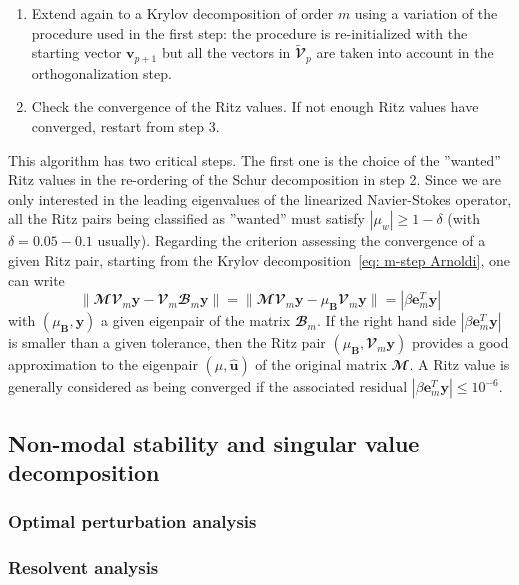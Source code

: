 \begin{enumerate}
      \item Extend again to a Krylov decomposition of order $m$ using a variation of the procedure used in the first step: the procedure is re-initialized with the starting vector ${\mathbf v}_{p+1}$ but all the vectors in $\tilde{\mathbfcal{V}}_p$ are taken into account in the orthogonalization step.

      \item Check the convergence of the Ritz values. If not enough Ritz values have converged, restart from step 3.

    \end{enumerate}
    This algorithm has two critical steps. The first one is the choice of the ''wanted'' Ritz values in the re-ordering of the Schur decomposition in step 2. Since we are only interested in the leading eigenvalues of the linearized Navier-Stokes operator, all the Ritz pairs being classified as ''wanted'' must satisfy $\left| \mu_w \right| \ge 1 - \delta$ (with $\delta = 0.05 - 0.1$ usually). Regarding the criterion assessing the convergence of a given Ritz pair, starting from the Krylov decomposition~\eqref{eq: m-step Arnoldi}, one can write
    \begin{equation}
      \| \mathbfcal{M} \mathbfcal{V}_m \mathbf{y} - \mathbfcal{V}_m \mathbfcal{B}_m \mathbf{y} \| = \| \mathbfcal{M} \mathbfcal{V}_m \mathbf{y} - \mu_{\mathbf B} \mathbfcal{V}_m \mathbf{y} \| = \left| \beta \mathbf{e}_m^T \mathbf{y} \right|
      \label{eq: Krylov convergence}
    \end{equation}
    with $(\mu_{\mathbf B},\mathbf{y})$ a given eigenpair of the matrix $\mathbfcal{B}_m$. If the right hand side $\left| \beta {\mathbf e}_{m}^T{\mathbf y} \right|$ is smaller than a given tolerance, then the Ritz pair $(\mu_{\mathbf B}, \mathbfcal{V}_m {\mathbf y})$ provides a good approximation to the eigenpair $(\mu, \hat{\mathbf u})$ of the original matrix $\mathbfcal{M}$. A Ritz value is generally considered as being converged if the associated residual $\left| \beta {\mathbf e}_{m}^T{\mathbf y} \right| \le 10^{-6}$.



  \subsection{Non-modal stability and singular value decomposition}

    \subsubsection{Optimal perturbation analysis}

    \subsubsection{Resolvent analysis}
